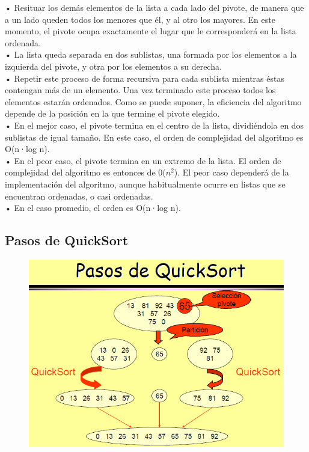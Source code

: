 \documentclass[a4,12pt]{article}
\begin{document}
• Resituar los demás elementos de la lista a cada lado del pivote, de manera que a un lado queden todos los menores que él, y al otro los mayores. En este momento, el pivote ocupa exactamente el lugar que le corresponderá en la lista ordenada.\\

• La lista queda separada en dos sublistas, una formada por los elementos a la izquierda del pivote, y otra por los elementos a su derecha.\\

• Repetir este proceso de forma recursiva para cada sublista mientras éstas contengan más de un elemento. Una vez terminado este proceso todos los elementos estarán ordenados. Como se puede suponer, la eficiencia del algoritmo depende de la posición en la que termine el pivote elegido.\\

• En el mejor caso, el pivote termina en el centro de la lista, dividiéndola en dos sublistas de igual tamaño. En este caso, el orden de complejidad del algoritmo es O(n·log n).\\

• En el peor caso, el pivote termina en un extremo de la lista. El orden de complejidad del algoritmo es entonces de 0($n^2$). El peor caso dependerá de la implementación del algoritmo, aunque habitualmente ocurre en listas que se encuentran ordenadas, o casi ordenadas.\\

• En el caso promedio, el orden es O(n·log n).\\

\subsection{Pasos de QuickSort}
\begin{figure}[H]
  \centering
    \includegraphics{imagenes/pasosQuickSort}
\end{figure}
\end{document}
